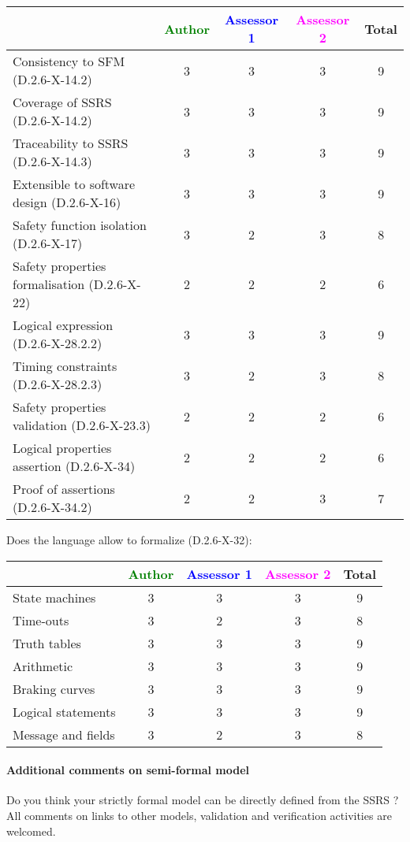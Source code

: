 \begin{tabular}{|l | c | c | c | c|}
\hline
& \textcolor{green}{Author} & \textcolor{blue}{Assessor 1} & \textcolor{magenta}{Assessor 2} & Total \\
\hline 
Consistency to SFM (D.2.6-X-14.2) & 3 & 3 &3 & 9 \\
\hline
Coverage of SSRS (D.2.6-X-14.2)  &3 & 3 &3 &  9 \\
\hline
Traceability to  SSRS (D.2.6-X-14.3)  &3 & 3 &3 &  9 \\
\hline
Extensible to software design (D.2.6-X-16)  &3 & 3 &3 & 9  \\
\hline
Safety function isolation (D.2.6-X-17)  &  3& 2 &3 & 8  \\
\hline 
Safety properties formalisation (D.2.6-X-22)  &  2&
2&2 & 6  \\
\hline
Logical expression (D.2.6-X-28.2.2)  &  3&3 &3 & 9  \\
\hline
Timing constraints (D.2.6-X-28.2.3)  &  3&2 &3 & 8 \\
\hline
Safety properties validation (D.2.6-X-23.3)  &  2& 2 &2 & 6  \\
\hline
Logical properties assertion (D.2.6-X-34)  &  2& 2 &2 & 6 \\
\hline
Proof of assertions (D.2.6-X-34.2)  &  2 & 2 &3 & 7 \\
\hline
\end{tabular}

Does the language allow to  formalize (D.2.6-X-32):

\begin{tabular}{|l | c | c | c | c|}
\hline
& \textcolor{green}{Author} & \textcolor{blue}{Assessor 1} & \textcolor{magenta}{Assessor 2} & Total \\
\hline 
State machines  & 3 & 3 &3 & 9 \\
\hline
Time-outs  & 3 & 2 &3 & 8 \\
\hline
Truth tables  & 3 & 3 &3 & 9 \\
\hline
Arithmetic  & 3& 3 &3 & 9 \\
\hline
Braking curves  & 3& 3 &3 & 9 \\
\hline
Logical statements & 3& 3 &3 & 9 \\
\hline
Message and fields &3 & 2 &3 & 8 \\
\hline
\end{tabular}

\paragraph{Additional comments on semi-formal  model} Do you think your strictly formal  model can be directly defined from the SSRS ?
All comments on links to  other models, validation and verification activities are welcomed.

